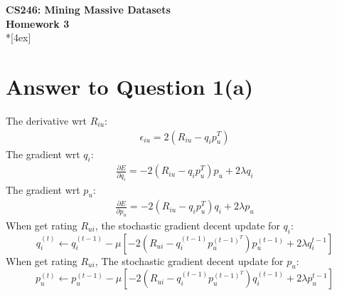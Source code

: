 \documentclass[11pt]{article}
\begin{document}
\thispagestyle{empty}
\parindent 0pt
\vfill
\large

\begin{center}
\LARGE{\bf \textsf{CS246: Mining Massive Datasets}}\\ {\bf \textsf{Homework 3}}
\\*[4ex]
\end{center}

\section*{Answer to Question 1(a)}
The derivative wrt $R_{iu}$:
\begin{equation*}
\begin{aligned}
    \epsilon_{iu} = 2(R_{iu} -q_ip_u^{T})
\end{aligned}
\end{equation*}
The gradient wrt $q_i$:
\begin{equation*}
\begin{aligned}
    \frac{\partial E}{\partial q_i}
    = -2(R_{iu} -q_ip_u^{T})p_u + 2\lambda q_i
\end{aligned}
\end{equation*}
The gradient wrt $p_u$:
\begin{equation*}
\begin{aligned}
    \frac{\partial E}{\partial p_u}
    = -2(R_{iu} -q_ip_u^{T})q_i + 2\lambda p_u
\end{aligned}
\end{equation*}
When get rating $R_{ui}$, the stochastic gradient decent update for $q_i$:
\begin{equation}
q_{i}^{(t)} \leftarrow q_{i}^{(t-1)} - \mu[-2(R_{ui} -q_{i}^{(t-1)}p_{u}^{(t-1)^T})p_{u}^{(t-1)} + 2\lambda q_{i}^{t-1}]
\end{equation}
When get rating $R_{ui}$, The stochastic gradient decent update for $p_u$:
\begin{equation}
p_{u}^{(t)} \leftarrow p_{u}^{(t-1)} - \mu[-2(R_{ui} -q_{i}^{(t-1)}p_{u}^{(t-1)^T})q_{i}^{(t-1)} + 2\lambda p_{u}^{t-1}]
\end{equation}


\pagebreak[4]
\end{document}
